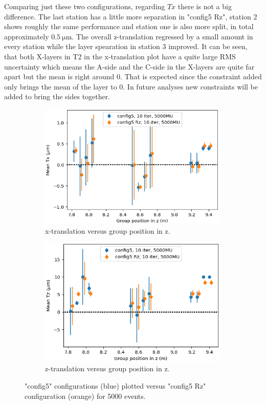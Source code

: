 Comparing just these two configurations, regarding $Tx$ there is not a big difference.
The last station has a little more separation in "config5 Rz", station 2 shows roughly the same performance and station one is also more split, in total approximately
$\SI{0.5}{\micro\metre}$. The overall z-translation regressed by a small amount in every station while the layer spearation in station 3 improved.
It can be seen, that both X-layers in T2 in the x-translation plot have a quite large RMS uncertainty which means the A-side and the C-side in the X-layers are quite far apart but the mean is right around 0. That is expected since the constraint added only brings the mean of the layer to 0. In future analyses new constraints will be added to bring the sides together.
\begin{figure}
  \centering
  \begin{subfigure}[b]{0.4\textwidth}
    \centering
    \includegraphics[width=\textwidth]{plots/renewed_plots/Tx_config5.png}
    \caption{x-translation versus group position in z.}
    \label{fig:config5_Tx}
  \end{subfigure}
  \hfill
  \begin{subfigure}[b]{0.4\textwidth}
    \centering
    \includegraphics[width=\textwidth]{plots/renewed_plots/Tz_config5.png}
    \caption{z-translation versus group position in z.}
    \label{fig:config5_Tz}
  \end{subfigure}
  \caption{"config5" configurations (blue) plotted versus "config5 Rz" configuration (orange) for 5000 events.}
  \label{fig:config5_tra}
\end{figure}

